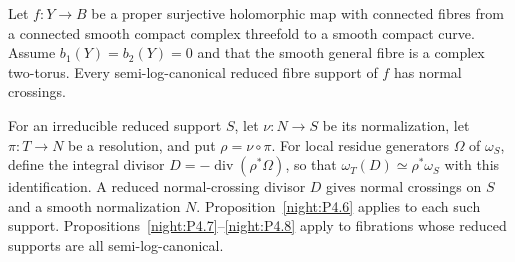 \begin{proposition}\hypertarget{tag-02WX}{}\label{night:P4.25}\label{stmt:P4.25}

Let $f:Y\to B$ be a proper surjective holomorphic map with connected
fibres from a connected smooth compact complex threefold to a smooth
compact curve. Assume $b_1(Y)=b_2(Y)=0$ and that the smooth general
fibre is a complex two-torus. Every semi-log-canonical reduced fibre
support of $f$ has normal crossings.

For an irreducible reduced support $S$, let $\nu:N\to S$ be its
normalization, let $\pi:T\to N$ be a resolution, and put
$\rho=\nu\circ\pi$. For local residue generators $\Omega$ of $\omega_S$,
define the integral divisor $D=-\operatorname{div}(\rho^*\Omega)$, so that
$\omega_T(D)\simeq\rho^*\omega_S$ with this identification.
A reduced normal-crossing divisor $D$ gives normal crossings on $S$
and a smooth normalization $N$. Proposition~\ref{night:P4.6} applies
to each such support. Propositions~\ref{night:P4.7}--\ref{night:P4.8}
apply to fibrations whose reduced supports are all semi-log-canonical.
\end{proposition}
